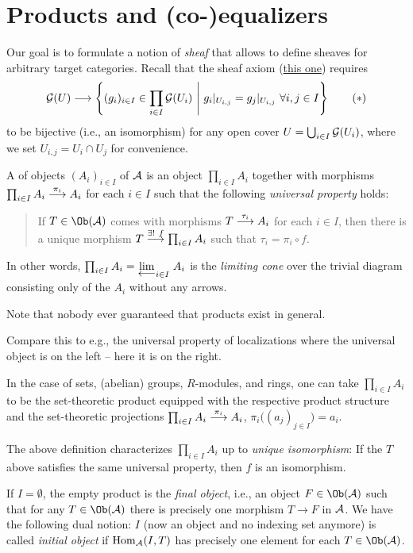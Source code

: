 \documentclass[a4paper,parskip=half,numbers=enddot, DIV=12]{scrreprt}
\begin{document}
  \section{Products and (co-)equalizers}
  Our goal is to formulate a notion of \emph{sheaf} that allows to define sheaves for arbitrary target categories. Recall that the sheaf axiom (\hyperref[sheafAxiom]{this one}) requires
  \begin{align}\lbl{eq:sheafAxiom}
  	\Gg(U)\longrightarrow\left\{(g_i)_{i\in I}\in\prod_{i\in I}\Gg(U_i)\st g_i|_{U_{i,j}}=g_j|_{U_{i,j}}\ \forall i,j\in I\right\}\tag{$*$}
  \end{align}
  to be bijective (i.e., an isomorphism) for any open cover $U=\bigcup_{i\in I}\mathcal{G}(U_i)$, where we set $U_{i,j}=U_i\cap U_j$ for convenience.
  
  \begin{defi}[Products]
  	A  of objects $(A_i)_{i\in I}$ of $\mathcal{A}$ is an object $\prod_{i\in I}A_i$ together with morphisms $\prod_{i\in I}A_i\morphism[\pi_i]A_i$ for each $i\in I$ such that the following \emph{universal property} holds:
  	\begin{quote}
  		If $T\in\Ob(\Aa)$ comes with morphisms $T\morphism[\tau_i]A_i$ for each $i\in I$, then there is a unique morphism $T\morphism[\exists!\ f]\prod_{i\in I}A_i$ such that $\tau_i=\pi_i\circ f$.
  	\end{quote}
  	In other words, $\prod_{i\in I}A_i=\limit[i\in I]{A_i}$ is the \emph{limiting cone} over the trivial diagram consisting only of the $A_i$ without any arrows.
  \end{defi}
  Note that nobody ever guaranteed that products exist in general.
  \begin{rem*}
  	\begin{alphanumerate}
  		\item Compare this to e.g., the universal property of localizations where the universal object is on the left -- here it is on the right.
  		\item In the case of sets, (abelian) groups, $R$-modules, and rings, one can take $\prod_{i\in I}A_i$ to be the set-theoretic product equipped with the respective product structure and the set-theoretic projections $\prod_{i\in I}A_i\morphism[\pi_i]A_i$, $\pi_i\big((a_j)_{j\in I}\big)=a_i$.
  		\item The above definition characterizes $\prod_{i\in I}A_i$ up to \emph{unique isomorphism}: If the $T$ above satisfies the same universal property, then $f$ is an isomorphism.
  		\item If $I=\emptyset$, the empty product is the \emph{final object}, i.e., an object $F\in\Ob(\Aa)$ such that for any $T\in\Ob(\Aa)$ there is precisely one morphism $T\to F$ in $\mathcal{A}$. We have the following dual notion: $I$ (now an object and no indexing set anymore) is called \emph{initial object} if $\operatorname{Hom}_{\mathcal{A}}(I,T)$ has precisely one element for each $T\in\Ob(\Aa)$.
  	\end{alphanumerate}
  \end{rem*}
\end{document}
